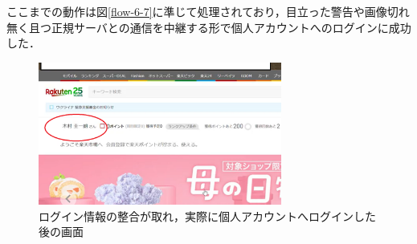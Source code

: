 \documentclass[dvipdfmx,twocolumn,9pt]{jsarticle}
\begin{document}
                ここまでの動作は図\ref{flow-6-7}に準じて処理されており，目立った警告や画像切れ無く且つ正規サーバとの通信を中継する形で個人アカウントへのログインに成功した．\
                \begin{figure}[h]
                    \centering
                    \includegraphics[width=8cm]{img/rakuten/rakuten-05.png}
                    \caption{ログイン情報の整合が取れ，実際に個人アカウントへログインした後の画面}
                    \label{rakuten-05}
                \end{figure}
\end{document}
